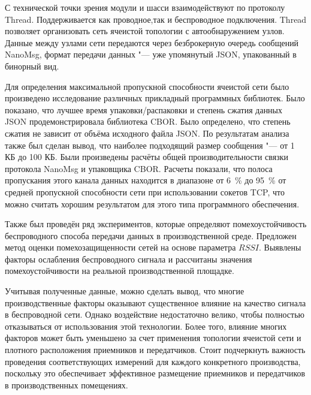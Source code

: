 С технической точки зрения модули и шасси взаимодействуют по протоколу Thread. Поддерживается как проводное,так и беспроводное подключения. Thread позволяет организовать сеть ячеистой топологии с автообнаружением узлов. Данные между узлами сети передаются через безброкерную очередь сообщений NanoMsg, формат передачи данных "--- уже упомянутый JSON, упакованный в бинорный вид.  

Для определения максимальной пропускной способности ячеистой сети было произведено исследование различных прикладный программных библиотек. Было показано, что лучшее время упаковки/распаковки и степень сжатия данных JSON продемонстрировала библиотека CBOR. Было определено, что степень сжатия не зависит от объёма исходного файла JSON. По результатам анализа также был сделан вывод, что наиболее подходящий размер сообщения "--- от 1 КБ до 100 КБ. Были произведены расчёты общей производительности связки протокола NanoMsg и упаковщика CBOR. Расчеты показали, что полоса пропускания этого канала данных находится в диапазоне от \SI{6}{\percent} до \SI{95}{\percent} от средней пропускной способности сети при использовании сокетов TCP, что можно считать хорошим результатом для этого типа программного обеспечения.

Также был проведён ряд экспериментов, которые определяют помехоустойчивость беспроводного способа передачи данных в производственной среде. Предложен метод оценки помехозащищенности сетей на основе параметра $RSSI$. Выявлены факторы ослабления беспроводного сигнала и рассчитаны значения помехоустойчивости на реальной производственной площадке.

Учитывая полученные данные, можно сделать вывод, что многие производственные факторы оказывают существенное влияние на качество сигнала в беспроводной сети. Однако воздействие недостаточно велико, чтобы полностью отказываться от использования этой технологии. Более того, влияние многих факторов может быть уменьшено за счет применения топологии ячеистой сети и плотного расположения приемников и передатчиков. Стоит подчеркнуть важность проведения соответствующих измерений для каждого конкретного производства, поскольку это обеспечивает эффективное размещение приемников и передатчиков в производственных помещениях.

\FloatBarrier